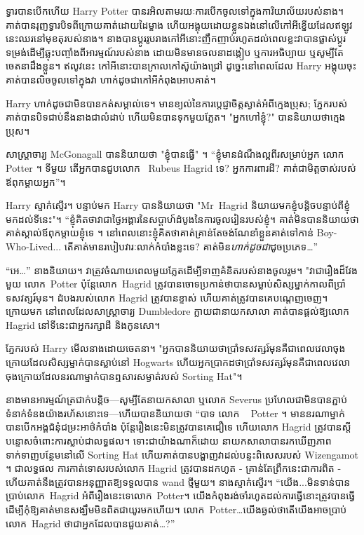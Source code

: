 {ទ្វារបានបើកហើយ Harry Potter បានរអិលតាមរយៈការបើកចូលទៅក្នុងការិយាល័យរបស់នាង។ គាត់បានរុញទ្វារបិទពីក្រោយគាត់ដោយដៃម្ខាង ហើយអង្គុយដោយខ្លួនឯងនៅលើកៅអីខ្នើយដែលឥឡូវនេះឈរនៅមុខតុរបស់នាង។ នាង​បាន​ប្តូរ​រូបរាង​កៅអី​នោះ​ញឹកញាប់​រហូត​ដល់​ពេលខ្លះ​វា​បាន​ផ្លាស់ប្តូរ​ទម្រង់​ដើម្បី​ឆ្លុះ​បញ្ចាំង​ពី​អារម្មណ៍​របស់​នាង ដោយ​មិន​មាន​ចលនា​ដង្កៀប ឬ​ការ​អធិប្បាយ ឬ​សូម្បី​តែ​ចេតនា​ដឹងខ្លួន​។ ឥលូវនេះ កៅអីនោះបានក្រាលកៅស៊ូយ៉ាងជ្រៅ ដូច្នេះនៅពេលដែល Harry អង្គុយចុះ គាត់បានលិចចូលទៅក្នុងវា ហាក់ដូចជាកៅអីកំពុងអោបគាត់។

Harry ហាក់ដូចជាមិនបានកត់សម្គាល់ទេ។ មានខ្យល់នៃការប្តេជ្ញាចិត្តស្ងាត់អំពីក្មេងប្រុស; ភ្នែក​របស់​គាត់​បាន​បិទ​ជាប់​នឹង​នាង​ជា​លំដាប់ ហើយ​មិន​បាន​ទុក​មួយ​ភ្លែត។ "អ្នកហៅខ្ញុំ?" បាននិយាយថាក្មេងប្រុស។

សាស្រ្តាចារ្យ McGonagall បាននិយាយថា "ខ្ញុំបានធ្វើ" ។ “ខ្ញុំមានដំណឹងល្អពីរសម្រាប់អ្នក លោក Potter ។ ទីមួយ តើអ្នកបានជួបលោក ~Rubeus Hagrid ទេ? អ្នកការពារដី? គាត់ជាមិត្តចាស់របស់ឪពុកម្តាយអ្នក”។

Harry ស្ទាក់ស្ទើរ។ បន្ទាប់មក Harry បាននិយាយថា "Mr~Hagrid និយាយមកខ្ញុំបន្តិចបន្ទាប់ពីខ្ញុំមកដល់ទីនេះ"។ “ខ្ញុំ​គិត​ថា​វា​ជា​ថ្ងៃ​អង្គារ​នៃ​សប្តាហ៍​ដំបូង​នៃ​ការ​ចូល​រៀន​របស់​ខ្ញុំ។ គាត់​មិន​បាន​និយាយ​ថា គាត់​ស្គាល់​ឪពុក​ម្តាយ​ខ្ញុំ​ទេ ។ នៅពេលនោះខ្ញុំគិតថាគាត់គ្រាន់តែចង់ណែនាំខ្លួនគាត់ទៅកាន់ Boy-Who-Lived... តើគាត់មានរបៀបវារៈលាក់កំបាំងខ្លះទេ? គាត់មិន\emph{ហាក់ដូចជា}ដូចប្រភេទ…”

“អេ…” នាងនិយាយ។ វា​ត្រូវ​ចំណាយ​ពេល​មួយ​ភ្លែត​ដើម្បី​ទាញ​គំនិត​របស់​នាង​ចូល​រួម។ "វាជារឿងដ៏វែងមួយ លោក~Potter ប៉ុន្តែលោក~Hagrid ត្រូវបានចោទប្រកាន់ថាបានសម្លាប់សិស្សម្នាក់កាលពីប្រាំទសវត្សរ៍មុន។ ដំបងរបស់លោក Hagrid ត្រូវបានខ្ទាស់ ហើយគាត់ត្រូវបានគេបណ្តេញចេញ។ ក្រោយមក នៅពេលដែលសាស្រ្តាចារ្យ Dumbledore ក្លាយជានាយកសាលា គាត់បានផ្តល់ឱ្យលោក ~ Hagrid នៅទីនេះជាអ្នករក្សាដី និងកូនសោ។

ភ្នែករបស់ Harry មើលនាងដោយចេតនា។ "អ្នកបាននិយាយថាប្រាំទសវត្សរ៍មុនគឺជាពេលវេលាចុងក្រោយដែលសិស្សម្នាក់បានស្លាប់នៅ Hogwarts ហើយអ្នកប្រាកដថាប្រាំទសវត្សរ៍មុនគឺជាពេលវេលាចុងក្រោយដែលនរណាម្នាក់បានឮសារសម្ងាត់របស់ Sorting Hat"។

នាង​មាន​អារម្មណ៍​ត្រជាក់​បន្តិច—សូម្បី​តែ​នាយក​សាលា ឬ​លោក Severus ប្រហែល​ជា​មិន​បាន​ភ្ជាប់​ទំនាក់ទំនង​យ៉ាង​រហ័ស​នោះ​ទេ—ហើយ​បាន​និយាយ​ថា “បាទ លោក ~ Potter ។ មាននរណាម្នាក់បានបើកអង្គជំនុំជម្រះអាថ៌កំបាំង ប៉ុន្តែរឿងនេះមិនត្រូវបានគេជឿទេ ហើយលោក Hagrid ត្រូវបានស្តីបន្ទោសចំពោះការស្លាប់ជាលទ្ធផល។ ទោះជាយ៉ាងណាក៏ដោយ នាយកសាលាបានរកឃើញភាពទាក់ទាញបន្ថែមនៅលើ Sorting Hat ហើយគាត់បានបង្ហាញវាដល់បន្ទះពិសេសរបស់ Wizengamot ។ ជាលទ្ធផល ការកាត់ទោសរបស់លោក Hagrid ត្រូវបានដកហូត - គ្រាន់តែព្រឹកនេះជាការពិត - ហើយគាត់នឹងត្រូវបានអនុញ្ញាតឱ្យទទួលបាន wand ថ្មីមួយ។ នាងស្ទាក់ស្ទើរ។ “យើង...មិនទាន់បានប្រាប់លោក~Hagrid អំពីរឿងនេះទេលោក~Potter។ យើង​កំពុង​រង់​ចាំ​រហូត​ដល់​ការ​ធ្វើ​នោះ​ត្រូវ​បាន​ធ្វើ ដើម្បី​កុំ​ឱ្យ​គាត់​មាន​សង្ឃឹម​មិន​ពិត​ជា​យូរ​មក​ហើយ។ លោក~Potter…យើងឆ្ងល់ថាតើយើងអាចប្រាប់លោក~Hagrid ថាជាអ្នកដែលបានជួយគាត់…?”

}
